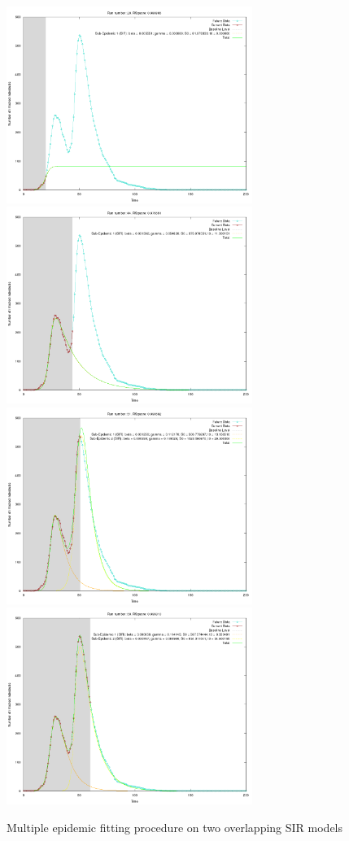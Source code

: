 \begin{centering}
\begin{figure}[h!]
  \includegraphics[width=8cm]{images/multi/sirsir1.png}
  \includegraphics[width=8cm]{images/multi/sirsir2.png}
  \includegraphics[width=8cm]{images/multi/sirsir3.png}
  \includegraphics[width=8cm]{images/multi/sirsir4.png}
  \caption{Multiple epidemic fitting procedure on two overlapping SIR models}
\label{fig:sirsir1}
  \end{figure}
\end{centering}




